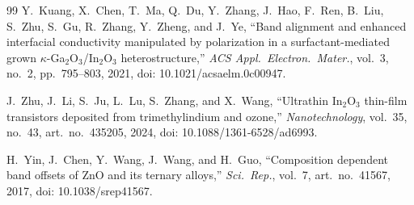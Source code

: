\documentclass[conference]{IEEEtran}
\begin{document}
\begin{thebibliography}{99}
Y.~Kuang, X.~Chen, T.~Ma, Q.~Du, Y.~Zhang, J.~Hao, F.~Ren, B.~Liu, S.~Zhu, S.~Gu, R.~Zhang, Y.~Zheng, and J.~Ye,
``Band alignment and enhanced interfacial conductivity manipulated by polarization in a surfactant-mediated grown $\kappa$-Ga$_2$O$_3$/In$_2$O$_3$ heterostructure,''
\textit{ACS Appl.\ Electron.\ Mater.}, vol.~3, no.~2, pp.~795--803, 2021, doi: 10.1021/acsaelm.0c00947.

J.~Zhu, J.~Li, S.~Ju, L.~Lu, S.~Zhang, and X.~Wang,
``Ultrathin In$_2$O$_3$ thin-film transistors deposited from trimethylindium and ozone,''
\textit{Nanotechnology}, vol.~35, no.~43, art.\ no.~435205, 2024, doi: 10.1088/1361-6528/ad6993.

H.~Yin, J.~Chen, Y.~Wang, J.~Wang, and H.~Guo,
``Composition dependent band offsets of ZnO and its ternary alloys,''
\textit{Sci.\ Rep.}, vol.~7, art.\ no.~41567, 2017, doi: 10.1038/srep41567.

\end{thebibliography}
\end{document}
